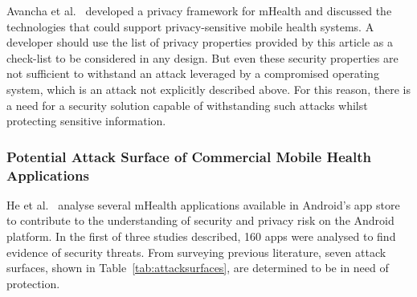 Avancha et al.~\cite{avancha2012privacy} developed a privacy framework for mHealth and discussed the technologies that could support privacy-sensitive mobile health systems. A developer should use the list of privacy properties provided by this article as a check-list to be considered in any design. But even these security properties are not sufficient to withstand an attack leveraged by a compromised operating system, which is an attack not explicitly described above. For this reason, there is a need for a security solution capable of withstanding such attacks whilst protecting sensitive information.
 
\subsubsection{Potential Attack Surface of Commercial Mobile Health Applications}

He et al.~\cite{he2014security} analyse several mHealth applications available in Android's app store to contribute to the understanding of security and privacy risk on the Android platform. In the first of three studies described, 160 apps were analysed to find evidence of security threats. From surveying previous literature, seven attack surfaces, shown in Table~\ref{tab:attacksurfaces}, are determined to be in need of protection.

